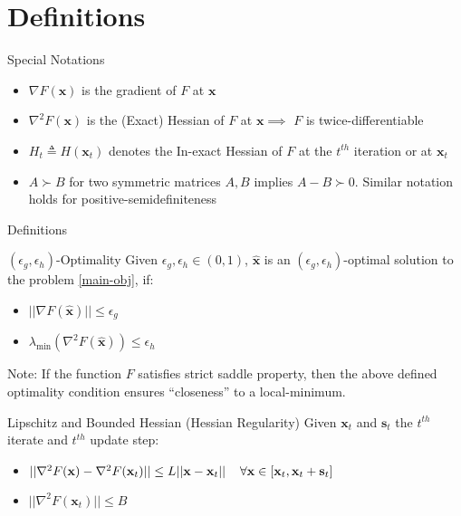 \documentclass{beamer}
\newcommand{\h}{\nabla^{2}}
\newcommand{\g}{\nabla}
\newcommand{\xbold}{\mathbf{x}}
\begin{document}
\section{Definitions}
\begin{frame}{Special Notations}
\begin{itemize}
\item<1->{\(\g F(\xbold)\) is the gradient of \(F\) at \(\xbold\)}
\item<2->{\(\h F(\xbold)\) is the (Exact) Hessian of \(F\) at \(\xbold \implies\) \(F\) is twice-differentiable}
\item<3->{\(H_{t} \triangleq H(\xbold_{t})\) denotes the In-exact Hessian of \(F\) at the \(t^{th}\) iteration or at \(\xbold_{t}\)}
\item<4->{\(A \succ B\) for two symmetric matrices \(A, B\) implies \(A - B \succ 0\). Similar notation holds for positive-semidefiniteness}
\end{itemize}
\end{frame}

\begin{frame}{Definitions}
\begin{alertblock}{\((\epsilon_{g}, \epsilon_{h})\)-Optimality}
Given \(\epsilon_{g}, \epsilon_{h} \in (0, 1)\), \(\mathbf{\hat{x}}\) is an \((\epsilon_{g}, \epsilon_{h})\)-optimal solution to the problem \ref{main-obj}, if:
\begin{itemize}
\item \(||\g F(\mathbf{\hat{x}}) || \leq \epsilon_{g}\)
\item \(\lambda_{\min} (\h F(\mathbf{\hat{x}})) \leq \epsilon_{h}\)
\end{itemize}
\end{alertblock}
\pause
Note: If the function \(F\) satisfies strict saddle property, then the above defined optimality condition ensures ``closeness'' to a local-minimum. %
\pause
\begin{alertblock}{Lipschitz and Bounded Hessian (Hessian Regularity)}
Given \(\xbold_{t}\) and \(\mathbf{s}_{t}\) the \(t^{th}\) iterate and \(t^{th}\) update step:
\begin{itemize}
\item \(||\h F(\xbold) - \h F(\xbold_{t})|| \leq L||\xbold - \xbold_{t}|| \hspace{4mm} \forall \xbold \in [\xbold_{t}, \xbold_{t} + \mathbf{s}_{t}]\)
\item \(||\h F(\xbold_{t}) || \leq B\)
\end{itemize}
\end{alertblock}
\end{frame}
\end{document}
